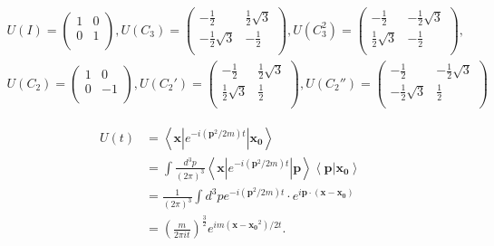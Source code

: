 \documentclass[floatfix,nofootinbib,superscriptaddress,fleqn]{revtex4}
\begin{document}
\begin{align*}
  U(I) = \begin{pmatrix}
    1&0\\
    0&1\\
  \end{pmatrix},
  U(C_3)= \begin{pmatrix}
    -\frac12&\frac12\sqrt{3}  \\
    -\frac12\sqrt{3}&-\frac12  \\
  \end{pmatrix}  ,
  U(C_3^2)= \begin{pmatrix}
    -\frac12&-\frac12\sqrt{3}  \\
    \frac12\sqrt{3}&-\frac12  \\
  \end{pmatrix} ,\\
  U(C_2)= \begin{pmatrix}
    1&0  \\
    0&-1  \\
  \end{pmatrix},
  U(C_2')= \begin{pmatrix}
    -\frac12&\frac12\sqrt{3}  \\
    \frac12\sqrt{3}&\frac12  \\
  \end{pmatrix},
  U(C_2'')= \begin{pmatrix}
    -\frac12&-\frac12\sqrt{3}  \\
    -\frac12\sqrt{3}&\frac12  \\
  \end{pmatrix}
\end{align*}

\begin{align*}
  U(t) &= \left<\mathbf{x}\left|e^{-i(\mathbf{p}^2/2m)t}
  \right| \mathbf{x_0}\right> \\
  &=\int \frac{d^3p}{(2\pi)^3}\left<\mathbf{x}\left|e^{-i(\mathbf{p}^2/2m)t}
  \right| \mathbf{p}\right>\left<\mathbf{p}|\mathbf{x_0}\right> \\
  &=\frac{1}{(2\pi)^3}\int d^3p e^{-i(\mathbf{p}^2/2m)t}\cdot
  e^{i\mathbf{p}\cdot(\mathbf{x}-\mathbf{x_0})} \\
  &=\left(\frac{m}{2\pi it}\right)^{\frac{3}{2}}
  e^{im(\mathbf{x}-\mathbf{x_0}^2)/2t}.
\end{align*}
\end{document}
